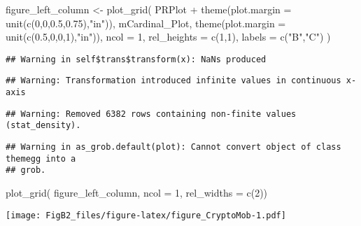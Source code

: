 \documentclass[
]{article}
\newenvironment{Shaded}{\begin{snugshade}}{\end{snugshade}}
\newcommand{\AttributeTok}[1]{\textcolor[rgb]{0.77,0.63,0.00}{#1}}
\newcommand{\DecValTok}[1]{\textcolor[rgb]{0.00,0.00,0.81}{#1}}
\newcommand{\FloatTok}[1]{\textcolor[rgb]{0.00,0.00,0.81}{#1}}
\newcommand{\FunctionTok}[1]{\textcolor[rgb]{0.00,0.00,0.00}{#1}}
\newcommand{\NormalTok}[1]{#1}
\newcommand{\OtherTok}[1]{\textcolor[rgb]{0.56,0.35,0.01}{#1}}
\newcommand{\SpecialCharTok}[1]{\textcolor[rgb]{0.00,0.00,0.00}{#1}}
\newcommand{\StringTok}[1]{\textcolor[rgb]{0.31,0.60,0.02}{#1}}
\begin{document}
\begin{Shaded}
\begin{Highlighting}[]
\NormalTok{figure\_left\_column }\OtherTok{\textless{}{-}} 
    \FunctionTok{plot\_grid}\NormalTok{(}
\NormalTok{    PRPlot }\SpecialCharTok{+}
      \FunctionTok{theme}\NormalTok{(}\AttributeTok{plot.margin =} \FunctionTok{unit}\NormalTok{(}\FunctionTok{c}\NormalTok{(}\DecValTok{0}\NormalTok{,}\DecValTok{0}\NormalTok{,}\FloatTok{0.5}\NormalTok{,}\FloatTok{0.75}\NormalTok{),}\StringTok{"in"}\NormalTok{)),}
\NormalTok{    mCardinal\_Plot,}
    \FunctionTok{theme}\NormalTok{(}\AttributeTok{plot.margin =} \FunctionTok{unit}\NormalTok{(}\FunctionTok{c}\NormalTok{(}\FloatTok{0.5}\NormalTok{,}\DecValTok{0}\NormalTok{,}\DecValTok{0}\NormalTok{,}\DecValTok{1}\NormalTok{),}\StringTok{"in"}\NormalTok{)),}
       \AttributeTok{ncol =} \DecValTok{1}\NormalTok{,}
    \AttributeTok{rel\_heights =} \FunctionTok{c}\NormalTok{(}\DecValTok{1}\NormalTok{,}\DecValTok{1}\NormalTok{),}
    \AttributeTok{labels =} \FunctionTok{c}\NormalTok{(}\StringTok{"B"}\NormalTok{,}\StringTok{"C"}\NormalTok{)}
\NormalTok{  )}
\end{Highlighting}
\end{Shaded}

\begin{verbatim}
## Warning in self$trans$transform(x): NaNs produced
\end{verbatim}

\begin{verbatim}
## Warning: Transformation introduced infinite values in continuous x-axis
\end{verbatim}

\begin{verbatim}
## Warning: Removed 6382 rows containing non-finite values (stat_density).
\end{verbatim}

\begin{verbatim}
## Warning in as_grob.default(plot): Cannot convert object of class themegg into a
## grob.
\end{verbatim}

\begin{Shaded}
\begin{Highlighting}[]
\FunctionTok{plot\_grid}\NormalTok{(}
\NormalTok{  figure\_left\_column,}
  \AttributeTok{ncol =} \DecValTok{1}\NormalTok{,}
  \AttributeTok{rel\_widths =} \FunctionTok{c}\NormalTok{(}\DecValTok{2}\NormalTok{))}
\end{Highlighting}
\end{Shaded}

\texttt{[image: FigB2\_files/figure-latex/figure\_CryptoMob-1.pdf]}
\end{document}
